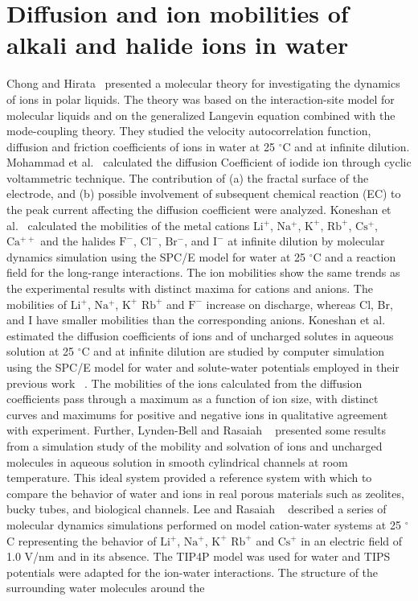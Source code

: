 \section{Diffusion and ion mobilities of alkali and halide ions in water}
 Chong and  Hirata~\citep{chong1999dynamics} presented a molecular theory for investigating the dynamics of ions in polar liquids. The theory was based on the interaction-site model for molecular liquids and on the generalized Langevin equation combined with the mode-coupling theory. They studied the velocity autocorrelation function, diffusion and friction coefficients of ions in water at 25 $^{\circ}$C and at infinite dilution. Mohammad et al.~\citep{mohammad2015diffusion} calculated the diffusion Coefficient of iodide ion  through cyclic voltammetric  technique. The contribution of (a) the fractal surface of  the electrode, and (b) possible involvement of subsequent chemical reaction (EC) to the peak current  affecting the diffusion coefficient were analyzed. Koneshan et al.~\citep{koneshan1998solvent} calculated the mobilities  of the metal cations $\mathrm{Li^{+}}$, $\mathrm{Na^{+}}$, $\mathrm{K^{+}}$, $\mathrm{Rb^{+}}$, $\mathrm{Cs^{+}}$,  $\mathrm{Ca^{++}}$ and the halides $\mathrm{F^{-}}$, $\mathrm{Cl^{-}}$, $\mathrm{Br^{-}}$, and  $\mathrm{I^{-}}$  at infinite dilution by molecular dynamics simulation using the SPC/E model for water at 25 $^{\circ}$C  and a reaction field for the long-range interactions. The ion mobilities show the same trends as the experimental  results with distinct maxima for cations and anions. The mobilities of  $\mathrm{Li^{+}}$, $\mathrm{Na^{+}}$, $\mathrm{K^{+}}$ $\mathrm{Rb^{+}}$ and $\mathrm{F^{-}}$  increase on discharge, whereas Cl, Br, and I have smaller mobilities  than the corresponding anions. Koneshan et al.~\citep{koneshan1998friction} estimated the diffusion coefficients of ions and of uncharged solutes in aqueous solution at 25 $^{\circ}$C and at  infinite dilution are studied by computer simulation using the SPC/E model for water and solute-water potentials  employed in their previous work~ \citep{koneshan1998solvent}. The mobilities of  the ions calculated from the diffusion coefficients pass through a maximum as a function of ion size, with  distinct curves and maximums for positive and negative ions in qualitative agreement with experiment. Further, Lynden-Bell and Rasaiah ~\citep{lynden1996mobility}  presented  some results from a simulation study of the mobility and solvation of ions and uncharged molecules in aqueous solution in smooth cylindrical channels at room temperature. This ideal system provided a reference system with which to compare the behavior of water and ions in real porous materials such as zeolites, bucky tubes, and biological channels.  Lee and   Rasaiah ~ \citep{lee1994molecular}  described a series of molecular dynamics simulations performed on model cation-water systems  at 25 $^{\circ}$C representing the behavior of $\mathrm{Li^{+}}$, $\mathrm{Na^{+}}$, $\mathrm{K^{+}}$ $\mathrm{Rb^{+}}$ and $\mathrm{Cs^{+}}$ in an electric field of 1.0 V/nm  and in its absence. The TIP4P model was used for water and TIPS potentials were adapted for the  ion-water interactions. The structure of the surrounding water molecules around the 